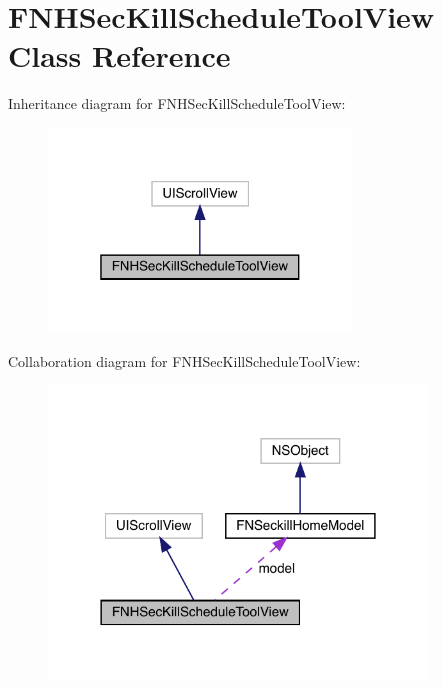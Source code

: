 \hypertarget{interface_f_n_h_sec_kill_schedule_tool_view}{}\section{F\+N\+H\+Sec\+Kill\+Schedule\+Tool\+View Class Reference}
\label{interface_f_n_h_sec_kill_schedule_tool_view}


Inheritance diagram for F\+N\+H\+Sec\+Kill\+Schedule\+Tool\+View\+:\nopagebreak
\begin{figure}[H]
\begin{center}
\leavevmode
\includegraphics[width=229pt]{interface_f_n_h_sec_kill_schedule_tool_view__inherit__graph}
\end{center}
\end{figure}


Collaboration diagram for F\+N\+H\+Sec\+Kill\+Schedule\+Tool\+View\+:\nopagebreak
\begin{figure}[H]
\begin{center}
\leavevmode
\includegraphics[width=285pt]{interface_f_n_h_sec_kill_schedule_tool_view__coll__graph}
\end{center}
\end{figure}

